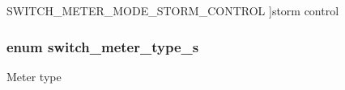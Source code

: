 \begin{Desc}
\begin{description}
{\hypertarget{group__Meters_gga77f75da70758cac1c9fb171fa93f8cc2ae05c75b4416550a9ef3670e715ef1793}{S\+W\+I\+T\+C\+H\+\_\+\+M\+E\+T\+E\+R\+\_\+\+M\+O\+D\+E\+\_\+\+S\+T\+O\+R\+M\+\_\+\+C\+O\+N\+T\+R\+O\+L}\label{group__Meters_gga77f75da70758cac1c9fb171fa93f8cc2ae05c75b4416550a9ef3670e715ef1793}
}]storm control \end{description}
\end{Desc}
\hypertarget{group__Meters_ga280b2958172e3ad05fee3ffdb47b8113}{
\subsubsection[{switch\+\_\+meter\+\_\+type\+\_\+s}]{\setlength{\rightskip}{0pt plus 5cm}enum {\bf switch\+\_\+meter\+\_\+type\+\_\+s}}}\label{group__Meters_ga280b2958172e3ad05fee3ffdb47b8113}
Meter type 

